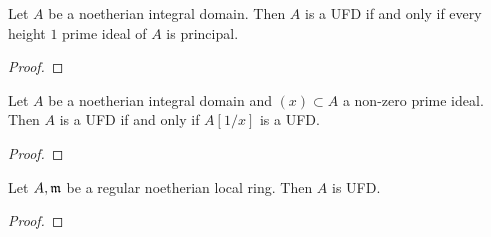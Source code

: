 
    \begin{lemma}\label{lem: UFD iff height 1 prime is principal}
        Let \(A\) be a noetherian integral domain.
        Then \(A\) is a UFD if and only if every height \(1\) prime ideal of \(A\) is principal.
    \end{lemma}
    \begin{proof}
    \end{proof}

    \begin{lemma}\label{lem: UFD iff localization at prime element x is UFD}
        Let \(A\) be a noetherian integral domain and \((x) \subset A\) a non-zero prime ideal.
        Then \(A\) is a UFD if and only if \(A[1/x]\) is a UFD.
    \end{lemma}
    \begin{proof}
    \end{proof}

    \begin{theorem}\label{thm: regular local ring is UFD}
        Let \(A,{\mathfrak{m}}\) be a regular noetherian local ring.
        Then \(A\) is UFD.
    \end{theorem}
    \begin{proof}
    \end{proof}